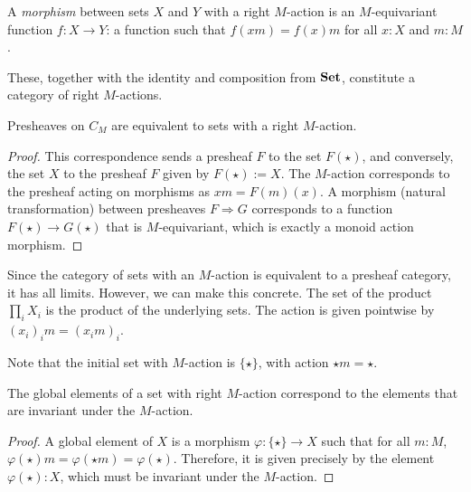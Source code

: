 \begin{definition}
  A \textit{morphism} between sets $ X $ and $ Y $ with a right $ M $-action is an $ M $-equivariant function $ f: X \to Y $: a function such that $ f(xm) = f(x)m $ for all $ x: X $ and $ m: M $.
\end{definition}

These, together with the identity and composition from $ \mathbf{Set} $, constitute a category  of right $ M $-actions.

\begin{lemma}
  Presheaves on $ C_M $ are equivalent to sets with a right $ M $-action.
\end{lemma}
\begin{proof}
  This correspondence sends a presheaf $ F $ to the set $ F(\star) $, and conversely, the set $ X $ to the presheaf $ F $ given by $ F(\star) := X $. The $ M $-action corresponds to the presheaf acting on morphisms as $ xm = F(m)(x) $. A morphism (natural transformation) between presheaves $ F \Rightarrow G $ corresponds to a function $ F(\star) \to G(\star) $ that is $ M $-equivariant, which is exactly a monoid action morphism.
\end{proof}

\begin{remark}
  Since the category of sets with an $ M $-action is equivalent to a presheaf category, it has all limits. However, we can make this concrete. The set of the product $ \prod_i X_i $ is the product of the underlying sets. The action is given pointwise by $ (x_i)_i m = (x_i m)_i $.
\end{remark}

Note that the initial set with $ M $-action is $ \{ \star \} $, with action $ \star m = \star $.

\begin{lemma}\label{lem:global-action-elements}
  The global elements of a set with right $ M $-action correspond to the elements that are invariant under the $ M $-action.
\end{lemma}
\begin{proof}
  A global element of $ X $ is a morphism $ \varphi: \{ \star \} \to X $ such that for all $ m: M $, $ \varphi(\star)m = \varphi(\star m) = \varphi(\star) $. Therefore, it is given precisely by the element $ \varphi(\star): X $, which must be invariant under the $ M $-action.
\end{proof}

